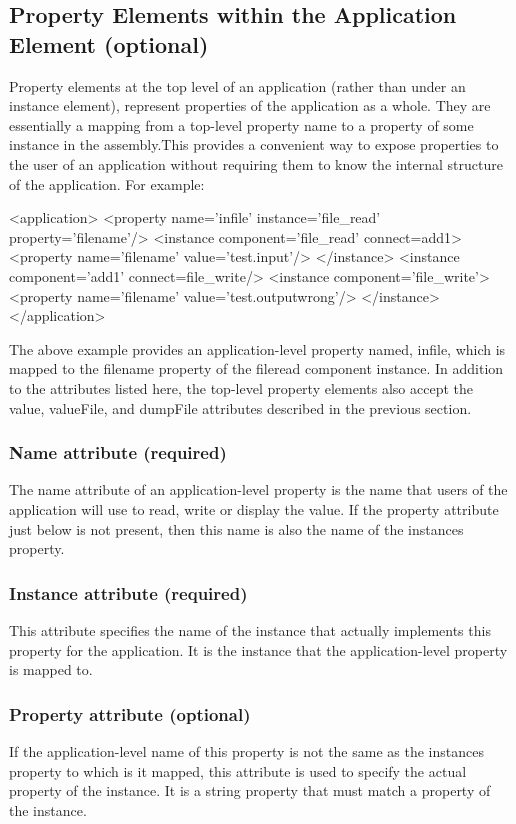 \documentclass[10pt, a4paper, oneside]{article}
\renewcommand\_{\textunderscore\allowbreak} %
\begin{document}
\subsection{Property Elements within the Application Element (optional)} Property elements at the top level of an application (rather than under an instance element), represent properties of the application as a whole.  They are essentially a mapping from a top-level property name to a property of some instance in the assembly.This provides a convenient way to expose properties to the user of an application without requiring them to know the internal structure of the application.  For example:\begin{ocpixml}
      <application>
        	<property name='infile' instance='file_read' property='filename'/>
        	<instance component='file_read' connect=add1>
        		<property name='filename' value='test.input'/>
        	</instance>
        	<instance component='add1' connect=file_write/>
        	<instance component='file_write'>
        		<property name='filename' value='test.outputwrong'/>
        	</instance>
      </application>\end{ocpixml}
The above example provides an application-level property named, infile, which is mapped to the filename property of the file\_read component instance.  In addition to the attributes listed here, the top-level property elements also accept the value, valueFile, and dumpFile attributes described in the previous section.
\subsubsection{Name attribute (required)} The name attribute of an application-level property is the name that users of the application will use to read, write or display the value.  If the property attribute just below is not present, then this name is also the name of the instances property.
\subsubsection{Instance attribute (required)}This attribute specifies the name of the instance that actually implements this property for the application.  It is the instance that the application-level property is mapped to.
\subsubsection{Property attribute (optional)} If the application-level name of this property is not the same as the instances property to which is it mapped, this attribute is used to specify the actual property of the instance. It is a string property that must match a property of the instance.
\end{document}
